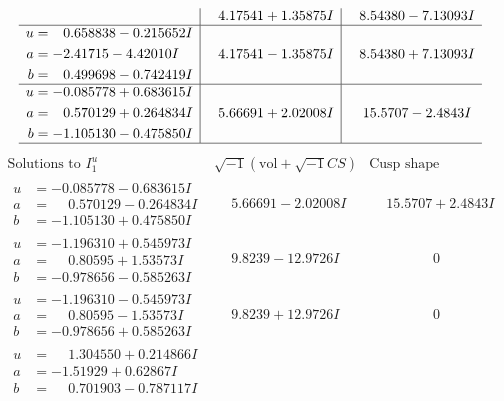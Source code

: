 \documentclass[1p]{elsarticle_modified}
\theoremstyle{definition}
\newcommand{\I}{\sqrt{-1}}
\begin{document}
$$\begin{array}{c|c|c}
 & \phantom{-}4.17541 + 1.35875 I & \phantom{-}8.54380 - 7.13093 I \\ \hline\begin{aligned}
u &= \phantom{-}0.658838 - 0.215652 I \\
a &= -2.41715 - 4.42010 I \\
b &= \phantom{-}0.499698 - 0.742419 I\end{aligned}
 & \phantom{-}4.17541 - 1.35875 I & \phantom{-}8.54380 + 7.13093 I \\ \hline\begin{aligned}
u &= -0.085778 + 0.683615 I \\
a &= \phantom{-}0.570129 + 0.264834 I \\
b &= -1.105130 - 0.475850 I\end{aligned}
 & \phantom{-}5.66691 + 2.02008 I & \phantom{-}15.5707 - 2.4843 I\\
 \hline 
 \end{array}$$\newpage$$\begin{array}{c|c|c}  
\text{Solutions to }I^u_{1}& \I (\text{vol} + \sqrt{-1}CS) & \text{Cusp shape}\\
 \hline 
\begin{aligned}
u &= -0.085778 - 0.683615 I \\
a &= \phantom{-}0.570129 - 0.264834 I \\
b &= -1.105130 + 0.475850 I\end{aligned}
 & \phantom{-}5.66691 - 2.02008 I & \phantom{-}15.5707 + 2.4843 I \\ \hline\begin{aligned}
u &= -1.196310 + 0.545973 I \\
a &= \phantom{-}0.80595 + 1.53573 I \\
b &= -0.978656 - 0.585263 I\end{aligned}
 & \phantom{-}9.8239 - 12.9726 I & \phantom{-0.000000 } 0 \\ \hline\begin{aligned}
u &= -1.196310 - 0.545973 I \\
a &= \phantom{-}0.80595 - 1.53573 I \\
b &= -0.978656 + 0.585263 I\end{aligned}
 & \phantom{-}9.8239 + 12.9726 I & \phantom{-0.000000 } 0 \\ \hline\begin{aligned}
u &= \phantom{-}1.304550 + 0.214866 I \\
a &= -1.51929 + 0.62867 I \\
b &= \phantom{-}0.701903 - 0.787117 I\end{aligned}

\end{array}$$
\end{document}
